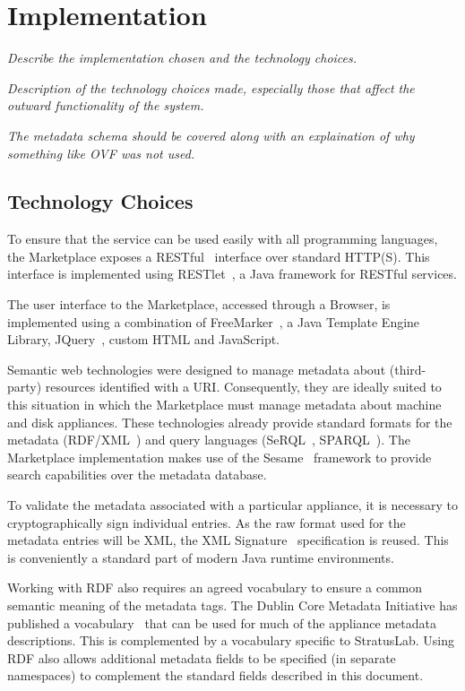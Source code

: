 \section{Implementation}
\label{sec:implementation}

{\em Describe the implementation chosen and the technology choices.}

{\em Description of the technology choices made, especially those that
  affect the outward functionality of the system.}

{\em The metadata schema should be covered along with an explaination
  of why something like OVF was not used.}

\subsection{Technology Choices}

To ensure that the service can be used easily with all programming
languages, the Marketplace exposes a RESTful~\cite{rest} interface
over standard HTTP(S).  This interface is implemented using
RESTlet~\cite{restlet}, a Java framework for RESTful
services.

The user interface to the Marketplace, accessed through a Browser, is implemented
using a combination of FreeMarker~\cite{freemarker}, a Java Template Engine Library, 
JQuery~\cite{jquery}, custom HTML and JavaScript.

Semantic web technologies were designed to manage metadata about
(third-party) resources identified with a URI.  Consequently, they are
ideally suited to this situation in which the Marketplace must manage
metadata about machine and disk appliances.  These technologies already
provide standard formats for the metadata (RDF/XML~\cite{rdfxml,
  rdfprimer, rdfschema}) and query languages (SeRQL~\cite{serql},
SPARQL~\cite{sparql}).  The Marketplace implementation makes use of the
Sesame~\cite{sesame} framework to provide search
capabilities over the metadata database.

To validate the metadata associated with a particular appliance, it is
necessary to cryptographically sign individual entries.  As the raw
format used for the metadata entries will be XML, the XML
Signature~\cite{xmlsig} specification is reused.  This is
conveniently a standard part of modern Java runtime environments.

Working with RDF also requires an agreed vocabulary to ensure a common
semantic meaning of the metadata tags.  The Dublin Core Metadata
Initiative has published a vocabulary~\cite{dcterms} that can be used
for much of the appliance metadata descriptions.  This is complemented by
a vocabulary specific to StratusLab.  Using RDF also allows additional
metadata fields to be specified (in separate namespaces) to complement
the standard fields described in this document.


